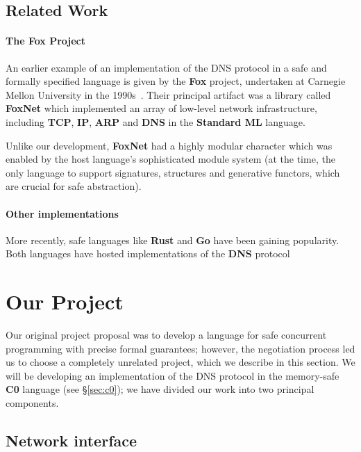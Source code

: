 \documentclass{article}
\newcommand\Kwd[1]{{\sffamily\bfseries{#1}}}
\begin{document}
\subsection{Related Work}

\paragraph{The \Kwd{Fox} Project}
An earlier example of an implementation of the DNS protocol in a safe
and formally specified language is given by the \Kwd{Fox} project,
undertaken at Carnegie Mellon University in the
1990s~\cite{biagioni-harper-lee-milnes:1994,
  biagioni-harper-lee:2001}. Their principal artifact was a library
called \Kwd{FoxNet} which implemented an array of low-level network
infrastructure, including \Kwd{TCP}, \Kwd{IP}, \Kwd{ARP} and \Kwd{DNS}
in the \Kwd{Standard ML} language.

Unlike our development, \Kwd{FoxNet} had a highly modular character
which was enabled by the host language's sophisticated module system
(at the time, the only language to support signatures, structures and
generative functors, which are crucial for safe abstraction).

\paragraph{Other implementations} More recently, safe languages like
\Kwd{Rust} and \Kwd{Go} have been gaining popularity. Both languages
have hosted implementations of the \Kwd{DNS}
protocol~\cite{github:trust-dns,github:miekg-dns}


\section{Our Project}

Our original project proposal was to develop a language for safe
concurrent programming with precise formal guarantees; however, the
negotiation process led us to choose a completely unrelated project,
which we describe in this section. We will be developing an
implementation of the DNS protocol in the memory-safe \Kwd{C0}
language (see \S\ref{sec:c0}); we have divided our work into two
principal components.

\subsection{Network interface}\label{sec:network-interface}
\end{document}
